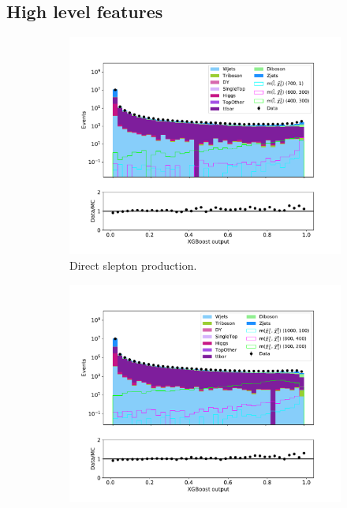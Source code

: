 \subsection{High level features}

\begin{figure}[H]
    \centering
    \begin{subfigure}[t!]{0.49\textwidth}
        \includegraphics[width = \textwidth]{Figures/Stacked/stackedplot_BDT_High_level_slepslep.pdf}
        \caption{Direct slepton production.}
        \label{fig:}
    \end{subfigure}
    \begin{subfigure}[t!]{0.49\textwidth}
        \includegraphics[width = \textwidth]{Figures/Stacked/stackedplot_BDT_High_level_slepsnu.pdf}

\end{subfigure}
\end{figure}
